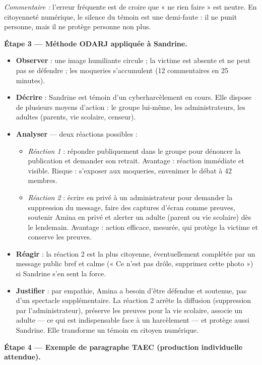 \documentclass[11pt]{article}
\begin{document}
\begin{exoresolu}
\emph{Commentaire :} l'erreur fréquente est de croire que « ne rien faire » est neutre. En citoyenneté numérique, le silence du témoin est une demi-faute : il ne punit personne, mais il ne protège personne non plus.

\textbf{Étape 3 — Méthode ODARJ appliquée à Sandrine.}

\begin{itemize}
\item \textbf{Observer} : une image humiliante circule ; la victime est absente et ne peut pas se défendre ; les moqueries s'accumulent (12 commentaires en 25 minutes).
\item \textbf{Décrire} : Sandrine est témoin d'un cyberharcèlement en cours. Elle dispose de plusieurs moyens d'action : le groupe lui-même, les administrateurs, les adultes (parents, vie scolaire, censeur).
\item \textbf{Analyser} — deux réactions possibles :
\begin{itemize}
\item \emph{Réaction 1} : répondre publiquement dans le groupe pour dénoncer la publication et demander son retrait. Avantage : réaction immédiate et visible. Risque : s'exposer aux moqueries, envenimer le débat à 42 membres.
\item \emph{Réaction 2} : écrire en privé à un administrateur pour demander la suppression du message, faire des captures d'écran comme preuves, soutenir Amina en privé et alerter un adulte (parent ou vie scolaire) dès le lendemain. Avantage : action efficace, mesurée, qui protège la victime et conserve les preuves.
\end{itemize}
\item \textbf{Réagir} : la réaction 2 est la plus citoyenne, éventuellement complétée par un message public bref et calme (« Ce n'est pas drôle, supprimez cette photo ») si Sandrine s'en sent la force.
\item \textbf{Justifier} : par empathie, Amina a besoin d'être défendue et soutenue, pas d'un spectacle supplémentaire. La réaction 2 arrête la diffusion (suppression par l'administrateur), préserve les preuves pour la vie scolaire, associe un adulte — ce qui est indispensable face à un harcèlement — et protège aussi Sandrine. Elle transforme un témoin en citoyen numérique.
\end{itemize}

\textbf{Étape 4 — Exemple de paragraphe TAEC (production individuelle attendue).}


\end{exoresolu}
\end{document}
